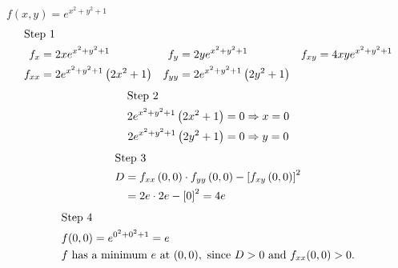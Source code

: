\documentclass[12pt]{article}
\newenvironment{problem}[2][]{
    \begin{trivlist}
        \item[
            {\bfseries #1}
            {\bfseries #2.}
        ]
}{\end{trivlist}}
\begin{document}
\begin{problem}{13}
    $f(x, y) = e^{x^2 + y^2 + 1}$
    \begin{align*}
        \shortintertext{Step 1}
        f_x &= 2x e^{x^2 + y^2 + 1} & f_y &= 2y e^{x^2 + y^2 + 1} & f_{xy} &= 4xy e^{x^2 + y^2 + 1} \\
        f_{xx} &= 2e^{x^2 + y^2 + 1} \left(2x^2 + 1\right) & f_{yy} &= 2e^{x^2 + y^2 + 1} \left(2y^2 + 1\right)
    \end{align*}
    \begin{align}
        \shortintertext{Step 2}
        2e^{x^2 + y^2 + 1} \left(2x^2 + 1\right) &= 0 \Rightarrow x = 0 \\
        2e^{x^2 + y^2 + 1} \left(2y^2 + 1\right) &= 0 \Rightarrow y = 0
    \end{align}
    \begin{align}
        \shortintertext{Step 3}
        D &= f_{xx} \left(0, 0\right) \cdot f_{yy} \left(0, 0\right) - \left[f_{xy} \left(0, 0\right)\right]^2 \\
        &= 2e \cdot 2e - \left[0\right]^2 = 4e
    \end{align}
    \begin{align}
        \shortintertext{Step 4}
        &f(0, 0) = e^{0^2 + 0^2 + 1} = e \\
        &f \text{ has a minimum } e \text{ at } (0, 0), \text{ since } D > 0 \text{ and } f_{xx} (0, 0) > 0. \\
    \end{align}
\end{problem}
\end{document}
